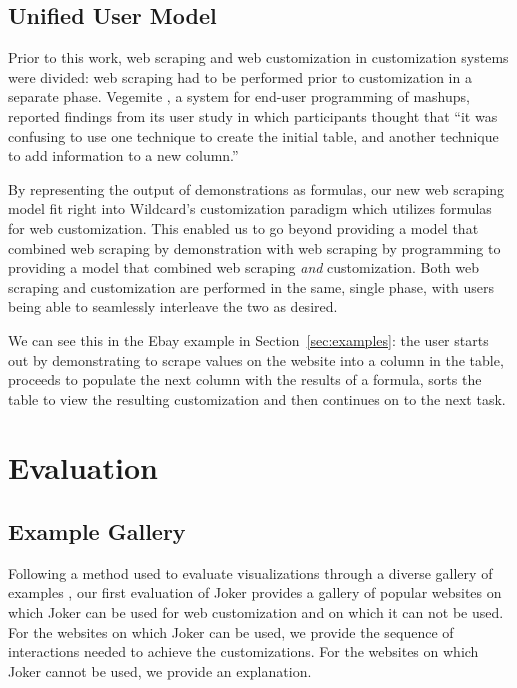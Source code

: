 \documentclass[sigconf,10pt]{acmart}
\begin{document}
\hypertarget{unified-user-model}{%
\subsection{Unified User Model}\label{unified-user-model}}

Prior to this work, web scraping and web customization in customization
systems \citep{huynh2006, lin2009} were divided: web scraping had to be
performed prior to customization in a separate phase. Vegemite
\citep{lin2009}, a system for end-user programming of mashups, reported
findings from its user study in which participants thought that ``it was
confusing to use one technique to create the initial table, and another
technique to add information to a new column.''

By representing the output of demonstrations as formulas, our new web
scraping model fit right into Wildcard's customization paradigm which
utilizes formulas for web customization. This enabled us to go beyond
providing a model that combined web scraping by demonstration with web
scraping by programming to providing a model that combined web scraping
\emph{and} customization. Both web scraping and customization are
performed in the same, single phase, with users being able to seamlessly
interleave the two as desired.

We can see this in the Ebay example in Section~\ref{sec:examples}: the
user starts out by demonstrating to scrape values on the website into a
column in the table, proceeds to populate the next column with the
results of a formula, sorts the table to view the resulting
customization and then continues on to the next task.

\hypertarget{sec:evaluation}{%
\section{Evaluation}\label{sec:evaluation}}

\hypertarget{example-gallery}{%
\subsection{Example Gallery}\label{example-gallery}}

Following a method used to evaluate visualizations through a diverse
gallery of examples \citep{ren2018}, our first evaluation of Joker
provides a gallery of popular websites on which Joker can be used for
web customization and on which it can not be used. For the websites on
which Joker can be used, we provide the sequence of interactions needed
to achieve the customizations. For the websites on which Joker cannot be
used, we provide an explanation.
\end{document}
